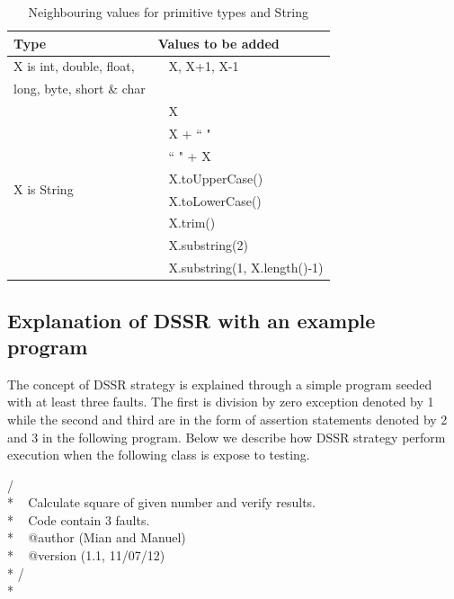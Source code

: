 \documentclass[conference]{IEEEtran}
\begin{document}
\begin{table}[ht]
\caption{Neighbouring values for primitive types and String} %
\centering %
\begin{tabular}{| l | l |} %
\hline\hline %
Type & Values to be added\\ [0.5ex] %
\hline %
\multirow{1}{*}{X is int, double, float, } & ~ X,  X+1, X-1 \\ %
\multirow{1}{*}{long, byte, short \& char} &  \\ 

\hline
\multirow{8}{*}{X is String} & ~ X\\ %

& ~ X + ``  "\\ %
& ~ ``  " + X \\ %
& ~ X.toUpperCase() \\
& ~ X.toLowerCase() \\
& ~ X.trim() \\
& ~ X.substring(2) \\
& ~ X.substring(1, X.length()-1) \\[1ex]
\hline
\hline %
\end{tabular}
\label{table:addvalues} %
\end{table}



\subsection{Explanation of DSSR with an example program}
The concept of DSSR strategy is explained through a simple program seeded with at least three faults. The first is division by zero exception denoted by 1 while the second and third are in the form of assertion statements denoted by 2 and 3 in the following program.  Below we describe how DSSR strategy perform execution when the following class is expose to testing.\\


\begingroup

    \fontsize{7pt}{8pt}\selectfont
    
\noindent
/\textasteriskcentered \textasteriskcentered \\*
\textasteriskcentered   ~ Calculate square of given number and verify results. \\*
\textasteriskcentered   ~ Code contain 3 faults.\\*
\textasteriskcentered   ~ @author (Mian and Manuel) \\* 
\textasteriskcentered   ~ @version (1.1, 11/07/12)\\*
\textasteriskcentered / \\*
\end{document}
